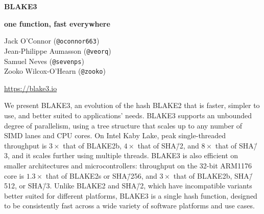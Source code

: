 \documentclass[11pt,notitlepage,a4paper]{article}
\title{\mytitle}
\newcommand{\mytitle}{BLAKE3}
\begin{document}
\selectfont
\pagestyle{plain}

{\let\thefootnote\relax{}}

\begin{center}
{\Huge \bf \mytitle}

\medskip

{\Large \bf  one function, fast everywhere}

\medskip

Jack O'Connor (\texttt{@oconnor663}) \\
Jean-Philippe Aumasson (\texttt{@veorq}) \\
Samuel Neves (\texttt{@sevenps}) \\
Zooko Wilcox-O'Hearn (\texttt{@zooko}) \\

\medskip

{\large \url{https://blake3.io}}

\end{center}


\medskip

\begin{center}
  \begin{minipage}{0.92\linewidth}

      We present BLAKE3, an evolution of the hash BLAKE2 that is faster,
      simpler to use, and better suited to applications' needs.
      BLAKE3 supports an unbounded degree of parallelism, using a tree
      structure that scales up to any number of SIMD lanes and CPU
      cores.  
      On Intel Kaby Lake, peak single-threaded throughput is $3\times$
      that of BLAKE2b, $4\times$ that of SHA\=/2, and $8\times$ that of
      SHA\=/3, and it scales further using multiple threads. 
      BLAKE3 is also efficient on smaller architectures and
      microcontrollers: throughput on the 32-bit ARM1176 core is
      $1.3\times$ that of BLAKE2s or SHA\=/256, and $3\times$ that of
      BLAKE2b, SHA\=/512, or SHA\=/3. 
      Unlike BLAKE2 and SHA\=/2, which have incompatible variants better
      suited for different platforms, BLAKE3 is a single hash function,
      designed to be consistently fast across a wide variety of software
      platforms and use cases.

   \end{minipage}
\end{center}

\newpage

\tableofcontents

\newpage
\end{document}

